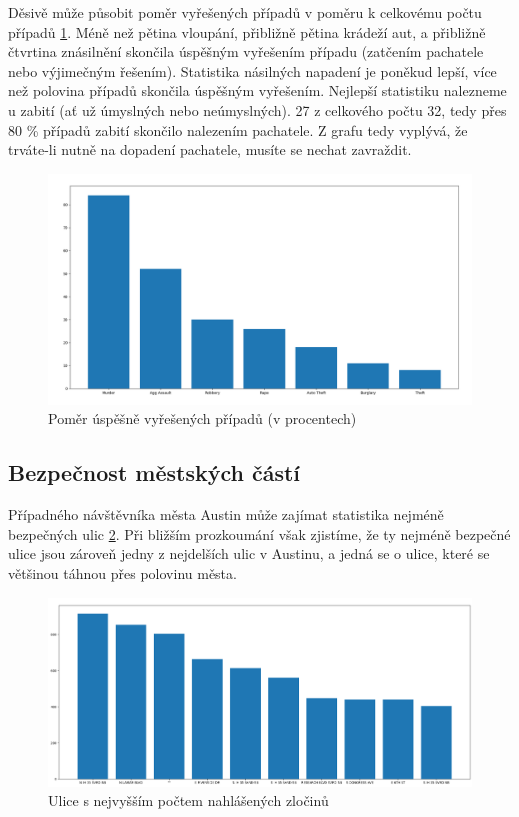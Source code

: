 \documentclass{article}
\begin{document}
Děsivě může působit poměr vyřešených případů v poměru k celkovému počtu případů
\ref{fig:solved_percentage}. Méně než pětina vloupání, přibližně pětina krádeží aut, a přibližně
čtvrtina znásilnění skončila úspěšným vyřešením případu (zatčením pachatele nebo výjimečným řešením).
Statistika násilných napadení je poněkud lepší, více než polovina případů skončila úspěšným vyřešením.
Nejlepší statistiku nalezneme u zabití (ať už úmyslných nebo neúmyslných). 27 z celkového počtu 32, tedy
přes 80 \% případů zabití skončilo nalezením pachatele. Z grafu tedy vyplývá, že trváte-li nutně na dopadení
pachatele, musíte se nechat zavraždit.

\begin{figure}
  \centering
  \includegraphics[width=1.4\textwidth]{figures/solved_percentage.png}
  \caption{Poměr úspěšně vyřešených případů (v procentech)}
  \label{fig:solved_percentage}
\end{figure}

\subsection{Bezpečnost městských částí}

Případného návštěvníka města Austin může zajímat statistika nejméně bezpečných ulic \ref{fig:worst_streets}.
Při bližším prozkoumání však zjistíme, že ty nejméně bezpečné ulice jsou zároveň jedny z nejdelších ulic
v Austinu, a jedná se o ulice, které se většinou táhnou přes polovinu města.

\begin{figure}
  \centering
  \includegraphics[width=1.4\textwidth]{figures/worst_streets.png}
  \caption{Ulice s nejvyšším počtem nahlášených zločinů}
  \label{fig:worst_streets}
\end{figure}
\end{document}
